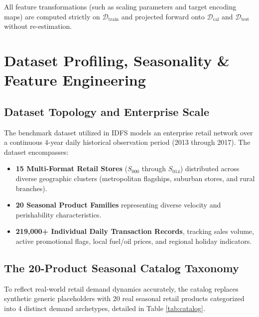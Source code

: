 \documentclass[12pt,a4paper,oneside]{report}
\theoremstyle{definition}
\begin{document}
All feature transformations (such as scaling parameters and target encoding maps) are computed strictly on $\mathcal{D}_{\text{train}}$ and projected forward onto $\mathcal{D}_{\text{cal}}$ and $\mathcal{D}_{\text{test}}$ without re-estimation.

\newpage
\chapter{Dataset Profiling, Seasonality \& Feature Engineering}

\section{Dataset Topology and Enterprise Scale}
The benchmark dataset utilized in IDFS models an enterprise retail network over a continuous 4-year daily historical observation period (2013 through 2017). The dataset encompasses:
\begin{itemize}[itemsep=0.15cm]
    \item \textbf{15 Multi-Format Retail Stores} ($S_{000}$ through $S_{014}$) distributed across diverse geographic clusters (metropolitan flagships, suburban stores, and rural branches).
    \item \textbf{20 Seasonal Product Families} representing diverse velocity and perishability characteristics.
    \item \textbf{219,000+ Individual Daily Transaction Records}, tracking sales volume, active promotional flags, local fuel/oil prices, and regional holiday indicators.
\end{itemize}

\section{The 20-Product Seasonal Catalog Taxonomy}
To reflect real-world retail demand dynamics accurately, the catalog replaces synthetic generic placeholders with 20 real seasonal retail products categorized into 4 distinct demand archetypes, detailed in Table \ref{tab:catalog}.
\end{document}
